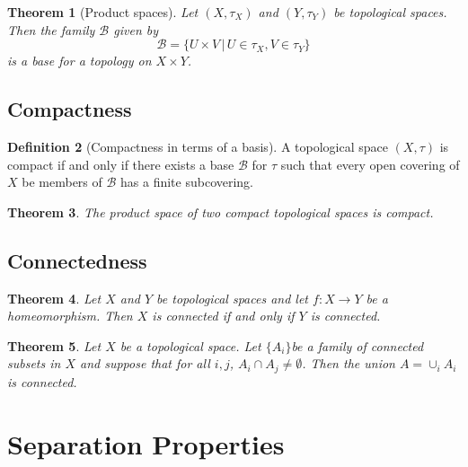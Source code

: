 \documentclass[10pt, oneside, reqno]{amsart}
\theoremstyle{plain}%
\newtheorem{thm}{Theorem}[section]
\theoremstyle{definition}
\newtheorem{defn}[thm]{Definition}
\theoremstyle{remark}
\newcommand{\topo}{(X,\tau)}
\begin{document}
\begin{thm}[Product spaces]
    Let $(X, \tau_X)$ and $(Y, \tau_Y)$ be topological spaces.  Then the family $\mathcal{B}$ given by \[
        \mathcal{B} = \{ U \times V \, | \, U \in \tau_X, V \in \tau_Y \}
    \]
    is a base for a topology on $X \times Y$.
\end{thm}

\subsection{Compactness} %
\label{sub:compactness}

\begin{defn}[Compactness in terms of a basis]
    A topological space $\topo$ is compact if and only if there exists a base $\mathcal{B}$ for $\tau$ such that every open covering of $X$ be members of $\mathcal{B}$ has a finite subcovering. 
\end{defn}

\begin{thm}
    The product space of two compact topological spaces is compact.
\end{thm}


\subsection{Connectedness} %
\label{sub:connectedness}

\begin{thm}
    Let $X$ and $Y $ be topological spaces and let $f : X \rightarrow Y$ be a homeomorphism.  Then $X$ is connected if and only if $Y$ is connected.    
\end{thm}

\begin{thm}
    Let $X$ be a topological space.  Let $\{ A_i \}$be a family of connected subsets in $X$ and suppose that for all $i,j$, $A_i \cap A_j \neq \emptyset$.  Then the union $A = \cup_i A_i$ is connected.
\end{thm}




\section{Separation Properties} %
\label{sec:spearation_properties}
\end{document}
